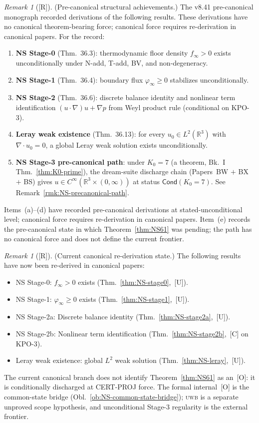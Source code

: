 \documentclass[12pt,oneside]{amsbook}
\theoremstyle{plain}
\theoremstyle{definition}
\theoremstyle{remark}
\newtheorem{remark}[theorem]{Remark}
\newcommand{\status}[1]{\textup{[#1]}}
\begin{document}
\begin{remark}[\status{R}]
\textup{(Pre-canonical structural achievements.)}
The v8.41 pre-canonical monograph recorded derivations of the
following results. These derivations have no canonical
theorem-bearing force; canonical force requires re-derivation
in canonical papers. For the record:
\begin{enumerate}[label=\textup{(\alph*)}]
 \item \textbf{NS Stage-0} (Thm.~36.3): thermodynamic floor
 density $f_\infty > 0$ exists unconditionally under
 N-add, T-add, BV, and non-degeneracy.
 \item \textbf{NS Stage-1} (Thm.~36.4): boundary flux
 $\varphi_\infty \geq 0$ stabilizes unconditionally.
 \item \textbf{NS Stage-2} (Thm.~36.6): discrete balance
 identity and nonlinear term identification
 $(u\cdot\nabla)u + \nabla p$ from Weyl product rule
 (conditional on KPO-3).
 \item \textbf{Leray weak existence} (Thm.~36.13): for every
 $u_0 \in L^2(\mathbb{R}^3)$ with $\nabla\cdot u_0 = 0$,
 a global Leray weak solution exists unconditionally.
 \item \textbf{NS Stage-3 pre-canonical path}: under $K_0=7$
 (a theorem, Bk.~I Thm.~\ref{thm:K0-prime}), the dream-suite
 discharge chain (Papers~BW $+$ BX $+$ BS) gives
 $u \in C^\infty(\mathbb{R}^3\times(0,\infty))$ at status
 $\mathsf{Cond}(K_0=7)$. See Remark~\ref{rmk:NS-precanonical-path}.
\end{enumerate}
Items~(a)--(d) have recorded pre-canonical derivations at
stated-unconditional level; canonical force requires
re-derivation in canonical papers.
Item~(e) records the pre-canonical state in which
Theorem~\ref{thm:NS61} was pending; the path has no canonical force
and does not define the current frontier.
\end{remark}

\begin{remark}[\status{R}]
\textup{(Current canonical re-derivation state.)}
The following results have now been re-derived in canonical papers:
\begin{itemize}
 \item NS Stage-0: $f_\infty > 0$ exists (Thm.~\ref{thm:NS-stage0},~[U]).
 \item NS Stage-1: $\varphi_\infty \geq 0$ exists (Thm.~\ref{thm:NS-stage1},~[U]).
 \item NS Stage-2a: Discrete balance identity (Thm.~\ref{thm:NS-stage2a},~[U]).
 \item NS Stage-2b: Nonlinear term identification (Thm.~\ref{thm:NS-stage2b},~[C]
 on KPO-3).
 \item Leray weak existence: global $L^2$ weak solution
 (Thm.~\ref{thm:NS-leray},~[U]).
\end{itemize}
The current canonical branch does not identify
Theorem~\ref{thm:NS61} as an~[O]: it is conditionally discharged at
CERT-PROJ force. The formal internal~[O] is the common-state bridge
(Obl.~\ref{ob:NS-common-state-bridge}); \textsc{uwb} is a separate
unproved scope hypothesis, and unconditional Stage-3 regularity is
the external frontier.
\end{remark}
\end{document}
